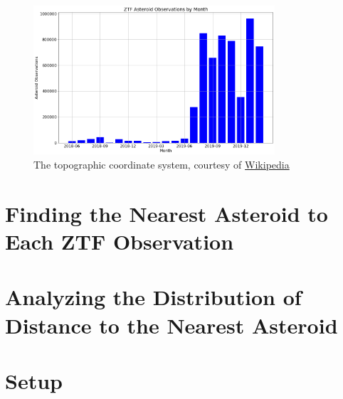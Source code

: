 \begin{figure}[hbt!]
\begin{center}
\includegraphics[width=0.8\textwidth]{../figs/ztf/ztf_ast_per_month.png}
\caption{The topographic coordinate system, courtesy of \href{https://en.wikipedia.org/wiki/Horizontal_coordinate_system}{Wikipedia}}
\end{center}
\end{figure}


\section{Finding the Nearest Asteroid to Each ZTF Observation}
\label{section_ztf_nearest_ast}

\section{Analyzing the Distribution of Distance to the Nearest Asteroid}
\label{section_nearest_ast_distribution}
\section{Setup}

